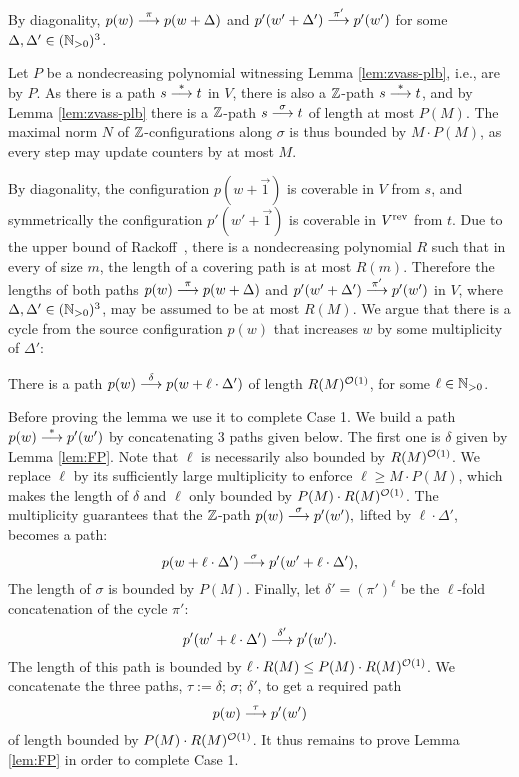 %
By diagonality, $p(w) \stackrel{\pi}{\longrightarrow} p(w+\Delta)$ and
$p'(w'+\Delta')\stackrel{\pi'}{\longrightarrow} p'(w')$  for some $\Delta,\Delta'\in(\mathbb{N}_{>0})^3$.

Let $P$ be a nondecreasing polynomial witnessing Lemma \ref{lem:zvass-plb}, i.e.,
\tzvass are \lb by $P$.
As there is a path $s \stackrel{*}{\longrightarrow} t$ in $V$, there is also a $\mathbb{Z}$-path $s\stackrel{*}{\longrightarrow} t$, and
by Lemma \ref{lem:zvass-plb} there is a $\mathbb{Z}$-path $s \stackrel{\sigma}{\longrightarrow} t$ of length at most $P(M)$.
The maximal norm $N$ of $\mathbb{Z}$-configurations along $\sigma$ is thus bounded by $M \cdot P(M)$,
as every step may update counters by at most $M$.

By diagonality, the configuration $p(w+\vec 1)$ is coverable in $V$ from $s$,
and symmetrically the configuration $p'(w' + \vec 1)$ is coverable in ${V}^{\text{rev}}$ from $t$.
Due to the upper bound of 
Rackoff~\cite[Lemma~3.4]{DBLP:journals/tcs/Rackoff78},
there is a nondecreasing polynomial $R$ such that in every \tvass of size $m$, the length of a covering
path is at most $R(m)$.
Therefore the lengths of 
both paths $p(w) \stackrel{\pi}{\longrightarrow} p(w+\Delta)$  and $p'(w'+\Delta')\stackrel{\pi'}{\longrightarrow} p'(w')$ in $V$, 
where $\Delta, \Delta' \in (\mathbb{N}_{>0})^3$,
may be assumed to be at most $R(M)$.
%
We argue that there is a cycle 
from the source configuration $p(w)$ 
that increases $w$ by some multiplicity of $\Delta'$:
%
\begin{lemma} \label{lem:FP}
There is a path $p(w) \stackrel{\delta}{\longrightarrow} p(w+ \ell \cdot\Delta')$ of length $R(M)^{{\cal O}(1)}$,
for some $\ell\in\mathbb{N}_{>0}$.
\end{lemma}
%
Before proving the lemma we use it to complete Case 1.
We build a path $p(w) \stackrel{*}{\longrightarrow} p'(w')$ by concatenating $3$ paths given below.
The first one is  $\delta$
given by Lemma \ref{lem:FP}.
Note that $\ell$ is necessarily also bounded by $R(M)^{{\cal O}(1)}$.
We replace $\ell$ by its sufficiently large multiplicity to enforce $\ell \geq M\cdot P(M)$, which
makes the length of $\delta$ and $\ell$ only bounded by $P(M) \cdot R(M)^{{\cal O}(1)}$.
The multiplicity guarantees that the $\mathbb{Z}$-path 
$
p(w) \stackrel{\sigma}{\longrightarrow} p'(w'), 
$
lifted by $\ell \cdot \Delta'$, becomes a path:
\[
p(w+\ell \cdot \Delta') \stackrel{\sigma}{\longrightarrow} p'(w' + \ell\cdot\Delta'), 
\]
The length of $\sigma$ is bounded by $P(M)$.
Finally, let $\delta' = (\pi')^\ell$ be the $\ell$-fold concatenation of
the cycle $\pi'$:
\[
p'(w'+\ell\cdot\Delta') \stackrel{\delta'}{\longrightarrow} p'(w').
\]
The length of this path is bounded by $\ell\cdot R(M) \leq P(M)\cdot R(M)^{{\cal O}(1)}$.
We concatenate the three paths, $\tau := \delta; \, \sigma;\, \delta'$, to get a required path
\[
p(w) \stackrel{\tau}{\longrightarrow} p'(w')
\]
of length bounded by $P(M) \cdot R(M)^{{\cal O}(1)}$.
It thus remains to prove Lemma \ref{lem:FP} in order to complete Case 1.


